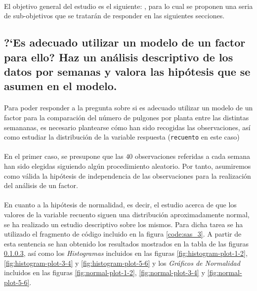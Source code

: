 \documentclass[11pt]{article}
\begin{document}
    \paragraph{}
    El objetivo general del estudio es el siguiente: \textbf{}, para lo cual se proponen una seria de sub-objetivos que se tratarán de responder en las siguientes secciones.

    \subsection{?`Es adecuado utilizar un modelo de un factor para ello? Haz un análisis descriptivo de los datos por semanas y valora las hipótesis que se asumen en el modelo.}
    \label{sec:e1}

      \paragraph{}
      Para poder responder a la pregunta sobre si es adecuado utilizar un modelo de un factor para la comparación del número de pulgones por planta entre las distintas semananas, es necesario plantearse cómo han sido recogidas las observaciones, así como estudiar la distribución de la variable respuesta (\texttt{recuento} en este caso)

      \paragraph{}
      En el primer caso, se presupone que las $40$ observaciones referidas a cada semana han sido elegidas siguiendo algún procedimiento aleatorio. Por tanto, asumiremos como válida la hipótesis de independencia de las observaciones para la realización del análisis de un factor.

      \paragraph{}
      En cuanto a la hipótesis de normalidad, es decir, el estudio acerca de que los valores de la variable recuento siguen  una distribución aproximadamente normal, se ha realizado un estudio descriptivo sobre los mismos. Para dicha tarea se ha utilizado el fragmento de código incluido en la figura \ref{code:sas_3}. A partir de esta sentencia se han obtenido los resultados mostrados en la tabla de las figuras \ref{}, así como los \emph{Histogramas} incluidos en las figuras \ref{fig:histogram-plot-1-2}, \ref{fig:histogram-plot-3-4} y \ref{fig:histogram-plot-5-6} y los \emph{Gráficos de Normalidad} incluidos en las figuras \ref{fig:normal-plot-1-2}, \ref{fig:normal-plot-3-4} y \ref{fig:normal-plot-5-6}.
\end{document}
